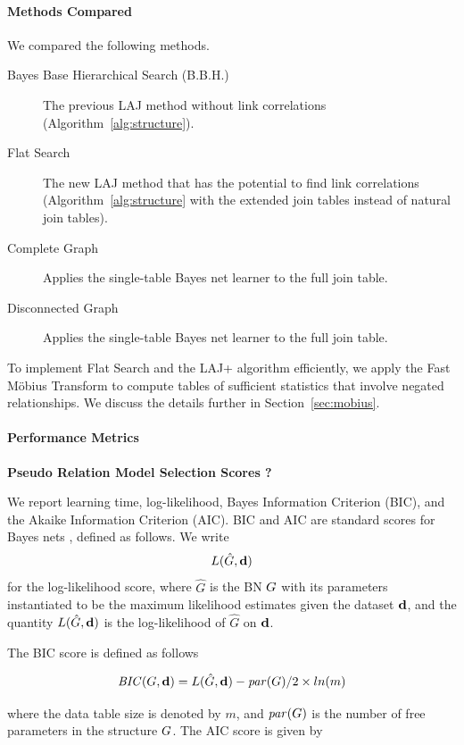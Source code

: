 \documentclass{article}
\begin{document}
\paragraph{Methods Compared}

We compared the following methods.

\begin{description}
\item[Bayes Base Hierarchical Search (B.B.H.) ] The previous LAJ method without link correlations (Algorithm~\ref{alg:structure}).
\item[Flat Search] The new LAJ method that has the potential to find link correlations (Algorithm~\ref{alg:structure} with the extended join tables instead of natural join tables).
\item[Complete Graph] Applies the single-table Bayes net learner to the full join table.
\item[Disconnected Graph] Applies the single-table Bayes net learner to the full join table.
\end{description}

To implement Flat Search and the LAJ+ algorithm efficiently, we apply the Fast M\"obius Transform to compute tables of sufficient statistics that involve negated relationships. We discuss the details further in Section~\ref{sec:mobius}.

\paragraph{Performance Metrics }

\textbf{Pseudo Relation Model Selection Scores  \cite{Schulte2011} ?}

 We report learning time, log-likelihood, Bayes Information Criterion (BIC), and the Akaike Information Criterion (AIC). BIC and AIC are standard scores for Bayes nets \cite{Chickering2003}, defined as follows. We write 
$$L(\hat{G},\mathbf{d})$$ for the log-likelihood score,
where $\hat{G}$ is the BN $G$ with its parameters instantiated to be the maximum likelihood estimates given the dataset $\mathbf{d}$, and the quantity $L(\hat{G},\mathbf{d})$ is the log-likelihood of $\hat{G}$ on $\mathbf{d}$. 

The BIC score is defined as follows \cite{Chickering2003,Schulte2011}

$$\mathit{BIC}(G,\mathbf{d}) = L(\hat{G},\mathbf{d}) - \mathit{par}(G)/2 \times ln(m)$$

where the data table size is denoted by $m$, and $\mathit{par}(G)$ is the number of free parameters in the structure $G$. The AIC score is given by 
\end{document}
